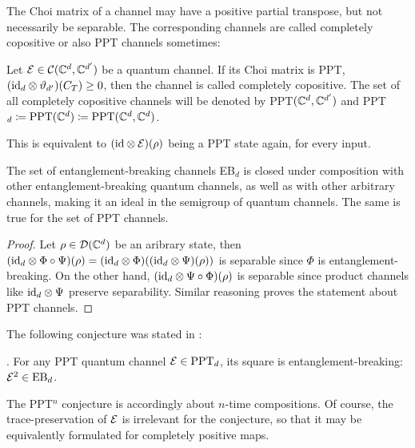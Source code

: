 The Choi matrix of a channel may have a positive partial transpose, but not necessarily be separable. The corresponding channels are called completely copositive or also PPT channels sometimes:
\begin{definition}
    Let $\mathcal E \in \mathcal C(\mathbb{C}^d,\mathbb{C}^{d'}) $ be a quantum channel. If its Choi matrix is PPT, $(\mathrm{id}_d \otimes \vartheta_{d'})(C_T)\geq 0$, then the channel is called completely copositive. The set of all completely copositive channels will be denoted by PPT$(\mathbb{C}^d,\mathbb{C}^{d'})$ and PPT$_d\coloneqq \text{PPT}(\mathbb{C}^d)\coloneqq \text{PPT}(\mathbb{C}^d,\mathbb{C}^{d})$.
\end{definition}
This is equivalent to $(\mathrm{id} \otimes \mathcal E)(\rho)$ being a PPT state again, for every input.
\begin{prop}
    The set of entanglement-breaking channels EB$_d$ is closed under composition with other entanglement-breaking quantum channels, as well as with other arbitrary channels, making it an ideal in the semigroup of quantum channels. The same is true for the set of PPT channels.
\end{prop}
\begin{proof}Let $\rho \in \mathcal D(\mathbb{C}^d)$ be an aribrary state, then
    $(\mathrm{id}_d \otimes \Phi \circ \Psi)(\rho) =(\mathrm{id}_d \otimes \Phi)((\mathrm{id}_d \otimes \Psi)(\rho))$ is separable since $\Phi$ is entanglement-breaking. On the other hand, $(\mathrm{id}_d \otimes \Psi \circ \Phi)(\rho)$ is separable since product channels like $\mathrm{id}_d \otimes \Psi$ preserve separability. Similar reasoning proves the statement about PPT channels.
\end{proof}

The following conjecture was stated in \cite{christandl2012ppt}:
\begin{conjecture}. For any PPT quantum channel $\mathcal E \in \text{PPT}_d$, its square is entanglement-breaking: $\mathcal E^2 \in \text{EB}_d$.
\end{conjecture}
The PPT$^n$ conjecture is accordingly about $n$-time compositions. Of course, the trace-preservation of $\mathcal E$ is irrelevant for the conjecture, so that it may be equivalently formulated for completely positive maps.




